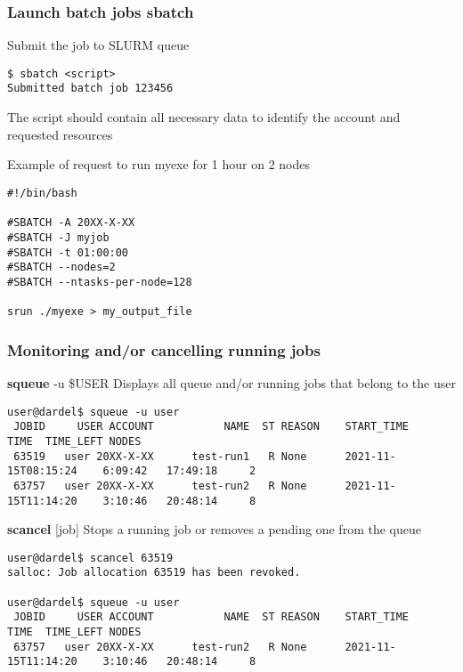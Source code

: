 \begin{frame}[fragile]
\frametitle{Launch batch jobs \hfill  \alert{\textbf{sbatch}}}
\begin{exampleblock}{Submit the job to SLURM queue}
  \begin{verbatim}
$ sbatch <script>
Submitted batch job 123456
  \end{verbatim}
\end{exampleblock}

\scriptsize
The script should contain all necessary data to identify the account and requested resources 
\begin{exampleblock}{Example of request to run myexe for 1 hour on 2 nodes}
\begin{verbatim}
#!/bin/bash

#SBATCH -A 20XX-X-XX
#SBATCH -J myjob
#SBATCH -t 01:00:00
#SBATCH --nodes=2
#SBATCH --ntasks-per-node=128

srun ./myexe > my_output_file
\end{verbatim}
\end{exampleblock}

\end{frame}

\begin{frame}[fragile]
\frametitle{Monitoring and/or cancelling running jobs }
\begin{alertblock}{\textbf{squeue} -u  \$USER}
  Displays all queue and/or running jobs that belong to the user
\tiny
  \begin{verbatim}
user@dardel$ squeue -u user
 JOBID     USER ACCOUNT           NAME  ST REASON    START_TIME                TIME  TIME_LEFT NODES
 63519   user 20XX-X-XX      test-run1   R None      2021-11-15T08:15:24    6:09:42   17:49:18     2
 63757   user 20XX-X-XX      test-run2   R None      2021-11-15T11:14:20    3:10:46   20:48:14     8
  \end{verbatim}
\end{alertblock}

\begin{alertblock}{\textbf{scancel} [job]}
Stops a running job or removes a pending one from the queue
\tiny
  \begin{verbatim}
user@dardel$ scancel 63519
salloc: Job allocation 63519 has been revoked.

user@dardel$ squeue -u user
 JOBID     USER ACCOUNT           NAME  ST REASON    START_TIME                TIME  TIME_LEFT NODES
 63757   user 20XX-X-XX      test-run2   R None      2021-11-15T11:14:20    3:10:46   20:48:14     8
  \end{verbatim}
\end{alertblock}
\end{frame}
